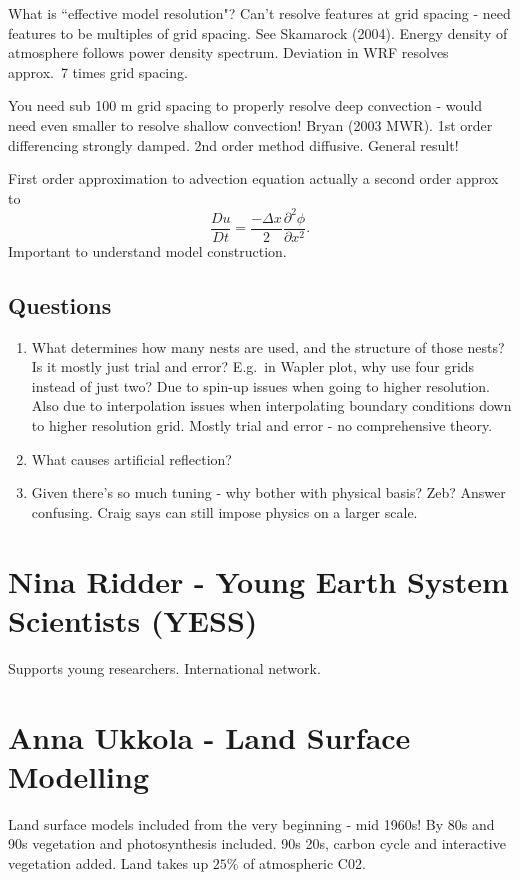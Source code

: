 \documentclass[12pt]{article}
\begin{document}
What is ``effective model resolution"? Can't resolve features at grid spacing - need features to be multiples of grid spacing. See Skamarock (2004). Energy density of atmosphere follows power density spectrum. Deviation in WRF resolves approx.~7 times grid spacing. 

You need sub 100 m grid spacing to properly resolve deep convection - would need even smaller to resolve shallow convection! Bryan (2003 MWR). 1st order differencing strongly damped. 2nd order method diffusive. General result!

First order approximation to advection equation actually a second order approx to 
$$\frac{D u}{Dt} = \frac{-\Delta x}{2} \frac{\partial^2 \phi}{\partial x^2}.$$
Important to understand model construction.

\subsection{Questions}
\begin{enumerate}
\item
What determines how many nests are used, and the structure of those nests? Is it mostly just trial and error? E.g.~in Wapler plot, why use four grids instead of just two? Due to spin-up issues when going to higher resolution. Also due to interpolation issues when interpolating boundary conditions down to higher resolution grid. Mostly trial and error - no comprehensive theory. 
\item
What causes artificial reflection?
\item
Given there's so much tuning - why bother with physical basis? Zeb? Answer confusing. Craig says can still impose physics on a larger scale. 
\end{enumerate}

\section{Nina Ridder - Young Earth System Scientists (YESS)}
Supports young researchers. International network.

\section{Anna Ukkola - Land Surface Modelling}
Land surface models included from the very beginning - mid 1960s! By 80s and 90s vegetation and photosynthesis included. 90s 20s, carbon cycle and interactive vegetation added. Land takes up $25\%$ of atmospheric C02. 
\end{document}
